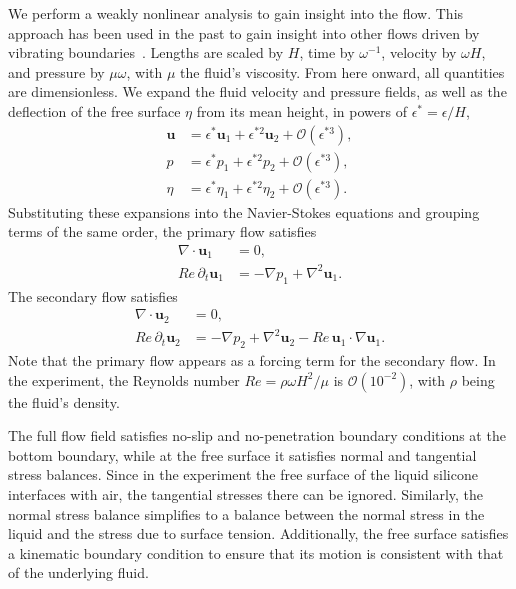 \documentclass[letter,11pt]{article}
\begin{document}
We perform a weakly nonlinear analysis to gain insight into the flow. This approach has been used in the past to gain insight into other flows driven by vibrating boundaries~\cite{hoepffner2009pumping}. Lengths are scaled by $H$, time by $\omega^{-1}$, velocity by $\omega H$, and pressure by $\mu \omega$, with $\mu$ the fluid's viscosity. From here onward, all quantities are dimensionless. We expand the fluid velocity and pressure fields, as well as the deflection of the free surface $\eta$ from its mean height, in powers of $\epsilon^* = \epsilon/H$,
\begin{align}
    \mathbf{u} &= \epsilon^* \mathbf{u}_1 + \epsilon^{*2} \mathbf{u}_2 + \mathcal{O}(\epsilon^{*3}), \\
    p &= \epsilon^* p_1 + \epsilon^{*2} p_2 + \mathcal{O}(\epsilon^{*3}), \\
    \eta &= \epsilon^* \eta_1 + \epsilon^{*2} \eta_2 + \mathcal{O}(\epsilon^{*3}).
\end{align}
Substituting these expansions into the Navier-Stokes equations and grouping terms of the same order, the primary flow satisfies
\begin{align}
    \nabla \cdot \mathbf{u}_1 &= 0, \\
    Re\, \partial_t \mathbf{u}_1 &= -\nabla p_1 + \nabla^2 \mathbf{u}_1.
\end{align}
The secondary flow satisfies
\begin{align}
    \nabla \cdot \mathbf{u}_2 &= 0, \\
    Re\, \partial_t \mathbf{u}_2 &= -\nabla p_2 + \nabla^2 \mathbf{u}_2 - Re\,\mathbf{u}_1 \cdot \nabla \mathbf{u}_1.
\end{align}
Note that the primary flow appears as a forcing term for the secondary flow. In the experiment, the Reynolds number $Re=\rho\omega H^2/\mu$ is $\mathcal{O}(10^{-2})$, with $\rho$ being the fluid's density.  

The full flow field satisfies no-slip and no-penetration boundary conditions at the bottom boundary, while at the free surface it satisfies normal and tangential stress balances. Since in the experiment the free surface of the liquid silicone interfaces with air, the tangential stresses there can be ignored. Similarly, the normal stress balance simplifies to a balance between the normal stress in the liquid and the stress due to surface tension. Additionally, the free surface satisfies a kinematic boundary condition to ensure that its motion is consistent with that of the underlying fluid. 
\end{document}
